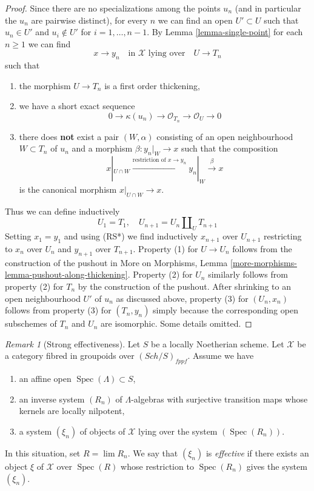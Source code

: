 \documentclass{stacks-project}
\theoremstyle{plain}
\theoremstyle{definition}
\theoremstyle{remark}
\newtheorem{remark}[subsection]{Remark}
\numberwithin{equation}{subsection}
\def\lim{\mathop{\mathrm{lim}}\nolimits}
\def\Spec{\mathop{\mathrm{Spec}}}
\def\Sch{\mathit{Sch}}
\begin{document}
\begin{proof}
Since there are no specializations among the points $u_n$ (and in
particular the $u_n$ are pairwise distinct), for every $n$
we can find an open $U' \subset U$
such that $u_n \in U'$ and $u_i \not \in U'$ for $i = 1, \ldots, n - 1$.
By Lemma \ref{lemma-single-point} for each $n \geq 1$ we can find
$$
x \to y_n
\quad\text{in }\mathcal{X}\text{ lying over}\quad
U \to T_n
$$
such that
\begin{enumerate}
\item the morphism $U \to T_n$ is a first order thickening,
\item we have a short exact sequence
$$
0 \to \kappa(u_n) \to \mathcal{O}_{T_n} \to \mathcal{O}_U \to 0
$$
\item there does {\bf not} exist a pair $(W, \alpha)$
consisting of an open neighbourhood $W \subset T_n$ of $u_n$
and a morphism $\beta : y_n|_W \to x$ such that the composition
$$
x|_{U \cap W} \xrightarrow{\text{restriction of }x \to y_n}
y_n|_W \xrightarrow{\beta} x
$$
is the canonical morphism $x|_{U \cap W} \to x$.
\end{enumerate}
Thus we can define inductively
$$
U_1 = T_1, \quad
U_{n + 1} = U_n \amalg_U T_{n + 1}
$$
Setting $x_1 = y_1$ and using (RS*) we find inductively
$x_{n + 1}$ over $U_{n + 1}$ restricting to
$x_n$ over $U_n$ and $y_{n + 1}$ over $T_{n + 1}$.
Property (1) for $U \to U_n$ follows from the construction
of the pushout in More on Morphisms, Lemma
\ref{more-morphisms-lemma-pushout-along-thickening}.
Property (2) for $U_n$ similarly follows from
property (2) for $T_n$ by the construction of the pushout.
After shrinking to an open neighbourhood $U'$ of $u_n$
as discussed above, property (3) for $(U_n, x_n)$ follows from property (3)
for $(T_n, y_n)$ simply because the corresponding open subschemes
of $T_n$ and $U_n$ are isomorphic. Some details omitted.
\end{proof}

\begin{remark}[Strong effectiveness]
\label{remark-strong-effectiveness}
Let $S$ be a locally Noetherian scheme.
Let $\mathcal{X}$ be a category fibred in groupoids over $(\Sch/S)_{fppf}$.
Assume we have
\begin{enumerate}
\item an affine open $\Spec(\Lambda) \subset S$,
\item an inverse system $(R_n)$ of $\Lambda$-algebras
with surjective transition maps whose kernels are locally nilpotent,
\item a system $(\xi_n)$ of objects of $\mathcal{X}$ lying
over the system $(\Spec(R_n))$.
\end{enumerate}
In this situation, set $R = \lim R_n$. We say that
$(\xi_n)$ is {\it effective} if there exists an object
$\xi$ of $\mathcal{X}$ over $\Spec(R)$ whose restriction
to $\Spec(R_n)$ gives the system $(\xi_n)$.
\end{remark}
\end{document}
